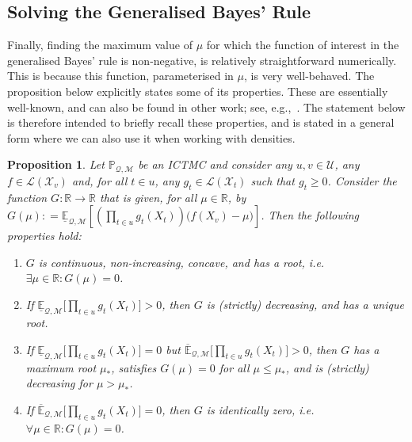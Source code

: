 \documentclass[3p]{elsarticle}
\newtheorem{proposition}[theorem]{Proposition}
\newcommand{\reals}{\mathbb{R}}
\newcommand{\states}{\mathcal{X}}
\newcommand{\lexp}{\underline{\mathbb{E}}_{\rateset,\mathcal{M}}}
\newcommand{\uexp}{\overline{\mathbb{E}}_{\rateset,\mathcal{M}}}
\newcommand{\gambles}{\mathcal{L}}
\newcommand{\rateset}{\mathcal{Q}}
\newcommand{\coloneqq}{:\!=}
\begin{document}
\subsection{Solving the Generalised Bayes' Rule}\label{sec:gbr}

Finally, finding the maximum value of $\mu$ for which the function of interest in the generalised Bayes' rule is non-negative, is relatively straightforward numerically. This is because this function, parameterised in $\mu$, is very well-behaved. The proposition below explicitly states some of its properties. These are essentially well-known, and can also be found in other work; see, e.g.,~\cite[Section 2.7.3]{de2015credal}. The statement below is therefore intended to briefly recall these properties, and is stated in a general form where we can also use it when working with densities.

\begin{proposition}\label{prop:GBR_properties}
Let $\mathbb{P}_{\rateset,\mathcal{M}}$ be an ICTMC and consider any $u,v\in\mathcal{U}$, any $f\in\gambles(\states_v)$ and, for all $t\in u$, any $g_{t}\in\gambles(\states_{t})$ such that $g_{t}\geq 0$. 
Consider the function $G: \reals\to\reals$ that is given, for all $\mu\in\reals$, by $G(\mu)\coloneqq \lexp\left[\left(\prod_{t\in u} g_{t}(X_{t})\right)\bigl(f(X_v) - \mu\bigr)\right]$.
Then the following properties hold: \vspace{-2pt}
\begin{enumerate}[label=G\arabic*:,ref=G\arabic*]
\item $G$ is continuous, non-increasing, concave, and has a root, i.e. $\exists \mu\in\reals:G(\mu)=0$. \label{GBR:always} \vspace{-3pt}
\item If\/ $\lexp\bigl[\prod_{t\in u} g_{t}(X_{t})\bigr] >0$, then $G$ is (strictly) decreasing, and has a unique root. \label{GBR:low_pos} \vspace{-3pt}
\item If\/ $\lexp\bigl[\prod_{t\in u} g_{t}(X_{t})\bigr]=0$ but $\uexp\bigl[\prod_{t\in u} g_{t}(X_{t})\bigr] >0$, then $G$ has a maximum root $\mu_*$, satisfies $G(\mu)=0$ for all $\mu\leq \mu_*$, and is (strictly) decreasing for $\mu>\mu_*$. \label{GBR:up_pos} \vspace{-3pt}
\item If\/ $\uexp\bigl[\prod_{t\in u} g_{t}(X_{t})\bigr]=0$, then $G$ is identically zero, i.e. $\forall \mu\in\reals: G(\mu)=0$. \label{GBR:none_pos}
\end{enumerate}
\end{proposition}
\end{document}
